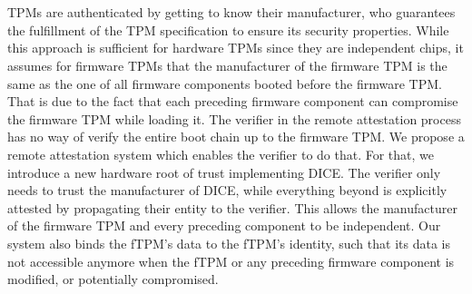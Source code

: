 \chapter{\abstractname}

TPMs are authenticated by getting to know their manufacturer, who guarantees the fulfillment of the TPM specification to ensure its security properties.
While this approach is sufficient for hardware TPMs since they are independent chips, it assumes for firmware TPMs that the manufacturer of the firmware TPM is the same as the one of all firmware components booted before the firmware TPM\@.
That is due to the fact that each preceding firmware component can compromise the firmware TPM while loading it.
The verifier in the remote attestation process has no way of verify the entire boot chain up to the firmware TPM\@.
We propose a remote attestation system which enables the verifier to do that.
For that, we introduce a new hardware root of trust implementing DICE\@.
The verifier only needs to trust the manufacturer of DICE, while everything beyond is explicitly attested by propagating their entity to the verifier.
This allows the manufacturer of the firmware TPM and every preceding component to be independent.
Our system also binds the fTPM's data to the fTPM's identity, such that its data is not accessible anymore when the fTPM or any preceding firmware component is modified, or potentially compromised.
